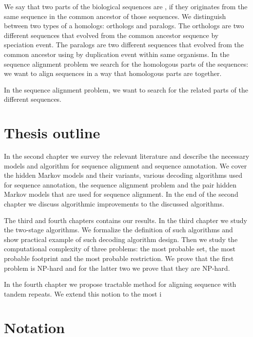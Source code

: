 We say that two parts of the biological sequences are ,
if they originates from the same sequence in the common ancestor of those
sequences. We distinguish between two types of a homologs: orthologs and
paralogs. The orthologs are two different sequences that evolved from the
common ancestor sequence by speciation event. The paralogs are two different
sequences that evolved from the common ancestor using by duplication event
within same organisms. In the sequence alignment problem we search for the
homologous parts of the sequences: we want to align sequences in a way that
homologous parts are together.

In the sequence alignment problem, we want to search for the related parts of the different sequences.

\section{Thesis outline}


In the second chapter we survey the relevant literature and describe the
necessary models and algorithm for sequence alignment and sequence annotation.
We cover the hidden Markov models and their variants, various decoding
algorithms used for sequence annotation, the sequence alignment problem and the
pair hidden Markov models that are used for sequence alignment.  In the end of
the second chapter we discuss algorithmic improvements to the discussed
algorithms.

The third and fourth chapters contains our results. In the third chapter we
study the two-stage algorithms. We formalize the definition of such algorithms
and show practical example of such decoding algorithm design. Then we study the
computational complexity of three problems: the most probable set, the most
probable footprint and the most probable restriction. We prove that the first
problem is NP-hard and for the latter two we prove that they are NP-hard. 

In the fourth chapter we propose tractable method for aligning sequence with
tandem repeats. We extend this notion to the most i

\section{Notation}


